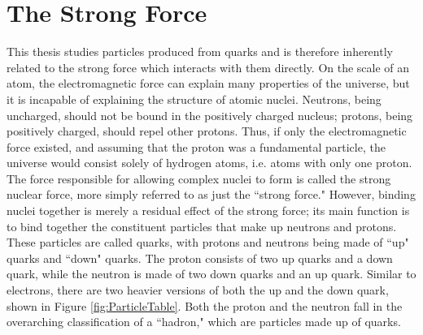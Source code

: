 \section{The Strong Force} \label{sec:StrongForce}
This thesis studies particles produced from quarks and is therefore inherently related to the strong force which interacts with them directly. On the scale of an atom, the electromagnetic force can explain many properties of the universe, but it is incapable of explaining the structure of atomic nuclei. Neutrons, being uncharged, should not be bound in the positively charged nucleus; protons, being positively charged, should repel other protons. Thus, if only the electromagnetic force existed, and assuming that the proton was a fundamental particle, the universe would consist solely of hydrogen atoms, i.e. atoms with only one proton. The force responsible for allowing complex nuclei to form is called the strong nuclear force, more simply referred to as just the ``strong force." However, binding nuclei together is merely a residual effect of the strong force; its main function is to bind together the constituent particles that make up neutrons and protons. These particles are called quarks, with protons and neutrons being made of ``up" quarks and ``down" quarks. The proton consists of two up quarks and a down quark, while the neutron is made of two down quarks and an up quark. Similar to electrons, there are two heavier versions of both the up and the down quark, shown in Figure \ref{fig:ParticleTable}. Both the proton and the neutron fall in the overarching classification of a ``hadron," which are particles made up of quarks.\par 

